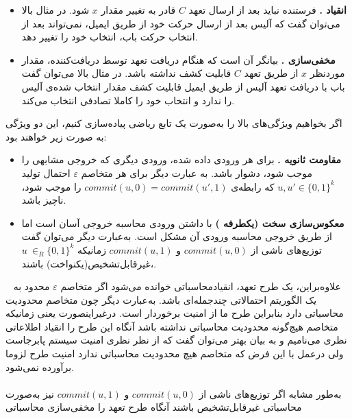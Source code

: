 \begin{itemize}
\item []{
\textbf{انقیاد .}
فرستنده نباید بعد از ارسال تعهد
$C$
 قادر به تغییر مقدار 
$x$
 شود.  
 در مثال بالا می‌توان گفت که  آلیس بعد از ارسال حرکت خود از طریق ایمیل، نمی‌تواند بعد از انتخاب حرکت باب، انتخاب خود را تغییر دهد. 
}
	
	
\item[]{
\textbf{‌مخفی‌سازی .}
بیانگر آن است که هنگام دریافت تعهد توسط دریافت‌کننده، مقدار موردنظر 
$x$
از طریق تعهد
$C$
قابلیت کشف نداشته باشد.
در مثال بالا می‌توان گفت باب با دریافت تعهد آلیس از طریق ایمیل قابلیت کشف مقدار انتخاب‌ شده‌ی آلیس را ندارد و انتخاب خود را کاملا تصادفی انتخاب می‌کند.
}
\end{itemize}

اگر بخواهیم ویژگی‌های بالا را به‌صورت یک تابع ریاضی پیاده‌سازی کنیم، این دو ویژگی به صورت زیر خواهند بود:
\begin{itemize}
	
\item[]{
\textbf{مقاومت ثانویه .}
برای هر ورودی داده شده، ورودی دیگری که خروجی مشابهی را موجب شود، دشوار باشد. به عبارت دیگر برای هر متخاصم
$\varepsilon$
احتمال تولید
$u,u' \in \{0,1\}^k$
که رابطه‌ی 
$commit(u,0) = commit(u',1)$
را موجب شود، ناچیز باشد.
}
	
	
\item[]{
\textbf{معکوس‌سازی سخت (یکطرفه )}
با داشتن ورودی محاسبه خروجی آسان است اما از طریق خروجی محاسبه ورودی آن مشکل است.
 به‌عبارت دیگر می‌توان گفت توزیع‌های ناشی از
 $commit(u,0)$
 و
 $commit(u,1)$
 زمانیکه
 $u~ {\in}_R \{0,1\}^k $
 ،غیرقابل‌تشخیص(یکنواخت) باشند.
}
\end{itemize}~
\iffalse
علاوه‌براین، یک طرح تعهد، انقیادمحاسباتی
 خوانده می‌شود اگر متخاصم
$\varepsilon$
محدود به یک الگوریتم احتمالاتی چندجمله‌ای باشد. به‌عبارت دیگر چون متخاصم محدودیت محاسباتی دارد بنابراین طرح ما از امنیت برخوردار است. درغیراینصورت یعنی زمانیکه متخاصم هیچ‌گونه محدودیت محاسباتی نداشته باشد آنگاه این طرح را انقیاد اطلاعاتی نظری
می‌نامیم و به بیان بهتر می‌توان گفت که از نظر نظری امنیت سیستم پابرجاست ولی درعمل با  این فرض که متخاصم هیچ محدودیت محاسباتی ندارد امنیت طرح لزوما برآورده نمی‌شود.
\\
\\
به‌طور مشابه اگر توزیع‌های ناشی از 
$commit(u,0)$
و
$commit(u,1)$
 نیز به‌صورت محاسباتی غیرقابل‌تشخیص باشند آنگاه طرح تعهد را مخفی‌سازی محاسباتی

